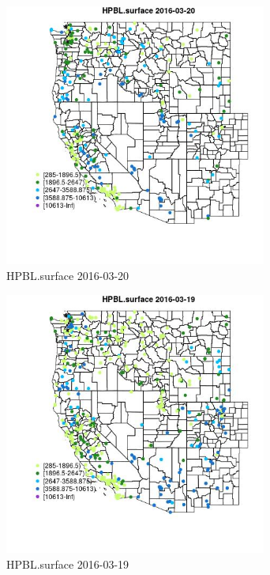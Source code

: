 \begin{figure} 
\centering  
\includegraphics[width=0.77\textwidth]{Code_Outputs/Report_ML_input_PM25_Step4_part_e_de_duplicated_aveswNAs_MapObsHPBLsurface2016-03-20.jpg} 
\caption{\label{fig:Report_ML_input_PM25_Step4_part_e_de_duplicated_aveswNAsMapObsHPBLsurface2016-03-20}HPBL.surface 2016-03-20} 
\end{figure} 
 

\clearpage 

\begin{figure} 
\centering  
\includegraphics[width=0.77\textwidth]{Code_Outputs/Report_ML_input_PM25_Step4_part_e_de_duplicated_aveswNAs_MapObsHPBLsurface2016-03-19.jpg} 
\caption{\label{fig:Report_ML_input_PM25_Step4_part_e_de_duplicated_aveswNAsMapObsHPBLsurface2016-03-19}HPBL.surface 2016-03-19} 
\end{figure} 
 


